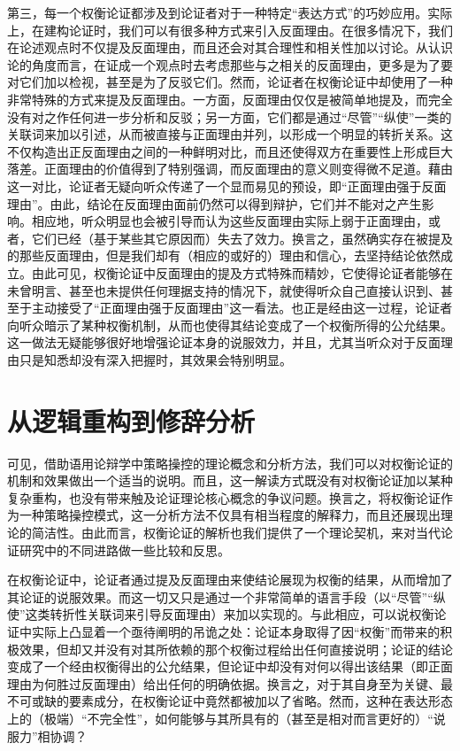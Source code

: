 \documentclass[b5paper,10.5pt,onecolumn,twoside,UTF8]{article}
\begin{document}
第三，每一个权衡论证都涉及到论证者对于一种特定“表达方式”的巧妙应用。实际上，在建构论证时，我们可以有很多种方式来引入反面理由。在很多情况下，我们在论述观点时不仅提及反面理由，而且还会对其合理性和相关性加以讨论。从认识论的角度而言，在证成一个观点时去考虑那些与之相关的反面理由，更多是为了要对它们加以检视，甚至是为了反驳它们。然而，论证者在权衡论证中却使用了一种非常特殊的方式来提及反面理由。一方面，反面理由仅仅是被简单地提及，而完全没有对之作任何进一步分析和反驳；另一方面，它们都是通过“尽管”“纵使”一类的关联词来加以引述，从而被直接与正面理由并列，以形成一个明显的转折关系。这不仅构造出正反面理由之间的一种鲜明对比，而且还使得双方在重要性上形成巨大落差。正面理由的价值得到了特别强调，而反面理由的意义则变得微不足道。藉由这一对比，论证者无疑向听众传递了一个显而易见的预设，即“正面理由强于反面理由”。由此，结论在反面理由面前仍然可以得到辩护，它们并不能对之产生影响。相应地，听众明显也会被引导而认为这些反面理由实际上弱于正面理由，或者，它们已经（基于某些其它原因而）失去了效力。换言之，虽然确实存在被提及的那些反面理由，但是我们却有（相应的或好的）理由和信心，去坚持结论依然成立。由此可见，权衡论证中反面理由的提及方式特殊而精妙，它使得论证者能够在未曾明言、甚至也未提供任何理据支持的情况下，就使得听众自己直接认识到、甚至于主动接受了“正面理由强于反面理由”这一看法。也正是经由这一过程，论证者向听众暗示了某种权衡机制，从而也使得其结论变成了一个权衡所得的公允结果。这一做法无疑能够很好地增强论证本身的说服效力，并且，尤其当听众对于反面理由只是知悉却没有深入把握时，其效果会特别明显。

\vspace{-0.5em}

\section{从逻辑重构到修辞分析}

\vspace{-0.5em}

可见，借助语用论辩学中策略操控的理论概念和分析方法，我们可以对权衡论证的机制和效果做出一个适当的说明。而且，这一解读方式既没有对权衡论证加以某种复杂重构，也没有带来触及论证理论核心概念的争议问题。换言之，将权衡论证作为一种策略操控模式，这一分析方法不仅具有相当程度的解释力，而且还展现出理论的简洁性。由此而言，权衡论证的解析也我们提供了一个理论契机，来对当代论证研究中的不同进路做一些比较和反思。 

在权衡论证中，论证者通过提及反面理由来使结论展现为权衡的结果，从而增加了其论证的说服效果。而这一切又只是通过一个非常简单的语言手段（以“尽管”“纵使”这类转折性关联词来引导反面理由）来加以实现的。与此相应，可以说权衡论证中实际上凸显着一个亟待阐明的吊诡之处：论证本身取得了因“权衡”而带来的积极效果，但却又并没有对其所依赖的那个权衡过程给出任何直接说明；论证的结论变成了一个经由权衡得出的公允结果，但论证中却没有对何以得出该结果（即正面理由为何胜过反面理由）给出任何的明确依据。换言之，对于其自身至为关键、最不可或缺的要素成分，在权衡论证中竟然都被加以了省略。然而，这种在表达形态上的（极端）“不完全性”，如何能够与其所具有的（甚至是相对而言更好的）“说服力”相协调？
\end{document}
